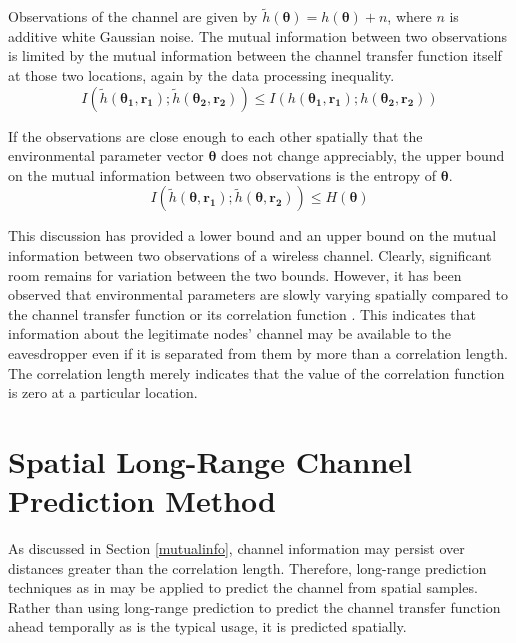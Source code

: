 \documentclass{allertonproc}
\begin{document}
Observations of the channel are given by $\tilde{h}(\boldsymbol{\theta})=h(\boldsymbol{\theta})+n$, where $n$ is additive white Gaussian noise.  The mutual information between two observations is limited by the mutual information between the channel transfer function itself at those two locations, again by the data processing inequality.
\begin{equation}
I(\tilde{h}(\boldsymbol{\theta_1},\mathbf{r_1}); \tilde{h}(\boldsymbol{\theta_2},\mathbf{r_2}))\leq I(h(\boldsymbol{\theta_1},\mathbf{r_1}); h(\boldsymbol{\theta_2},\mathbf{r_2}))
\end{equation}

If the observations are close enough to each other spatially that the environmental parameter vector $\boldsymbol{\theta}$ does not change appreciably, the upper bound on the mutual information between two observations is the entropy of $\boldsymbol{\theta}$.
\begin{equation}
I(\tilde{h}(\boldsymbol{\theta},\mathbf{r_1}); \tilde{h}(\boldsymbol{\theta},\mathbf{r_2}))\leq H(\boldsymbol{\theta})
\end{equation}

This discussion has provided a lower bound and an upper bound on the mutual information between two observations of a wireless channel.  Clearly, significant room remains for variation between the two bounds.  However, it has been observed that environmental parameters are slowly varying spatially compared to the channel transfer function or its correlation function \cite{jakes1974, duel-hallen2007}.  This indicates that information about the legitimate nodes' channel may be available to the eavesdropper even if it is separated from them by more than a correlation length.   The correlation length merely indicates that the value of the correlation function is zero at a particular location.  

\section{Spatial Long-Range Channel Prediction Method}\label{prediction}
As discussed in Section \ref{mutualinfo}, channel information may persist over distances greater than the correlation length. Therefore, long-range prediction techniques as in \cite{duel-hallen2007} may be applied to predict the channel from spatial samples. Rather than using long-range prediction to predict the channel transfer function ahead temporally as is the typical usage, it is predicted spatially.
\end{document}
